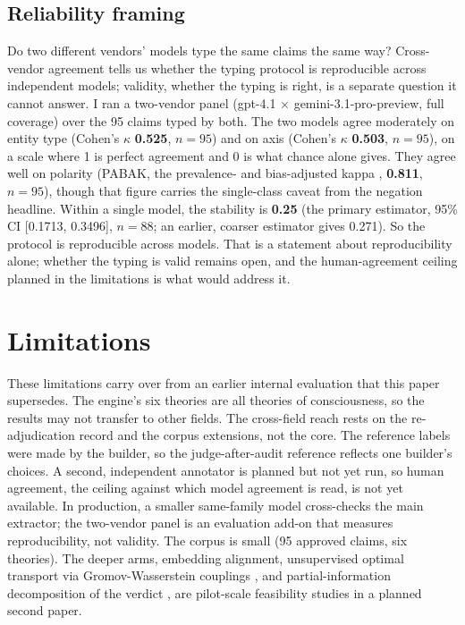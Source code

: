 \documentclass[11pt]{article}
\begin{document}
\subsection{Reliability framing}
Do two different vendors' models type the same claims the same way? Cross-vendor agreement tells us whether
the typing protocol is reproducible across independent models; validity, whether the typing is right, is a
separate question it cannot answer. I ran a
two-vendor panel (gpt-4.1 $\times$ gemini-3.1-pro-preview, full coverage) over the 95 claims typed by both.
The two models agree moderately on entity type (Cohen's $\kappa$ \cite{cohen1960} \textbf{0.525}, $n = 95$)
and on axis (Cohen's $\kappa$ \textbf{0.503}, $n = 95$), on a scale where 1 is perfect agreement and 0 is
what chance alone gives. They agree well on polarity (PABAK, the
prevalence- and bias-adjusted kappa \cite{byrt1993}, \textbf{0.811}, $n = 95$), though that figure carries
the single-class caveat from the negation headline. Within a single model, the stability is \textbf{0.25}
(the primary estimator, 95\% CI [0.1713, 0.3496], $n = 88$; an earlier, coarser estimator gives 0.271). So
the protocol is reproducible across models. That is a statement about reproducibility alone; whether the
typing is valid remains open, and the human-agreement ceiling planned in the limitations is what would
address it.

\section{Limitations}
These limitations carry over from an earlier internal evaluation that this paper supersedes. The engine's
six theories are all theories of consciousness, so the results may not transfer to other fields. The
cross-field reach rests on the re-adjudication record and the corpus extensions, not the core. The
reference labels were made by the builder, so the judge-after-audit reference reflects one builder's
choices. A second, independent annotator is planned but not yet run, so human agreement, the ceiling
against which model agreement is read, is not yet available. In production, a smaller same-family model
cross-checks the main extractor; the two-vendor panel is an evaluation add-on that measures reproducibility,
not validity. The corpus is small (95 approved claims, six theories). The deeper arms, embedding alignment,
unsupervised optimal transport via Gromov-Wasserstein couplings \cite{memoli2011}, and partial-information
decomposition of the verdict \cite{williams_beer2010}, are pilot-scale feasibility studies in a planned
second paper.
\end{document}
